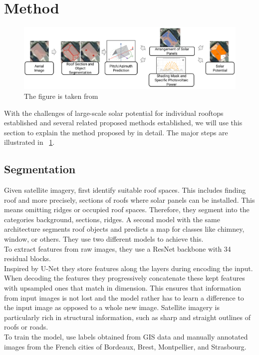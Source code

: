 \documentclass{article} %
\newcommand{\figref}[1]{\figurename~\ref{#1}}
\begin{document}
\section*{Method}
\begin{figure}
	\centering
	\includegraphics[width=\linewidth]{../figures/fig_1.pdf}
	\caption{The figure is taken from \citet{de2021predicting}}
	\label{fig:arch}
\end{figure}
With the challenges of large-scale solar potential for individual rooftops established and several related proposed methods established, we will use this section to explain the method proposed by \citet*{de2021predicting} in detail. The major steps are illustrated in \figref{fig:arch}.\\
\subsection*{Segmentation}
Given satellite imagery, \citet{de2021predicting} first identify suitable roof spaces. This includes finding roof and more precisely, sections of roofs where solar panels can be installed. This means omitting ridges or occupied roof spaces. Therefore, they segment into the categories background, sections, ridges. A second model with the same architecture segments roof objects and predicts a map for classes like chimney, window, or others. They use two different models to achieve this. \cite{de2021predicting}\\
To extract features from raw images, they use a ResNet backbone \cite{he2016deep} with 34 residual blocks.\\
Inspired by U-Net \cite{ronneberger2015u} they store features along the layers during encoding the input. When decoding the features they progressively concatenate these kept features with upsampled ones that match in dimension. This ensures that information from input images is not lost and the model rather has to learn a difference to the input image as opposed to a whole new image. Satellite imagery is particularly rich in structural information, such as sharp and straight outlines of roofs or roads.\\
To train the model, \citet{de2021predicting} use labels obtained from GIS data and manually annotated images from the French cities of Bordeaux, Brest, Montpellier, and Strasbourg.
\end{document}
